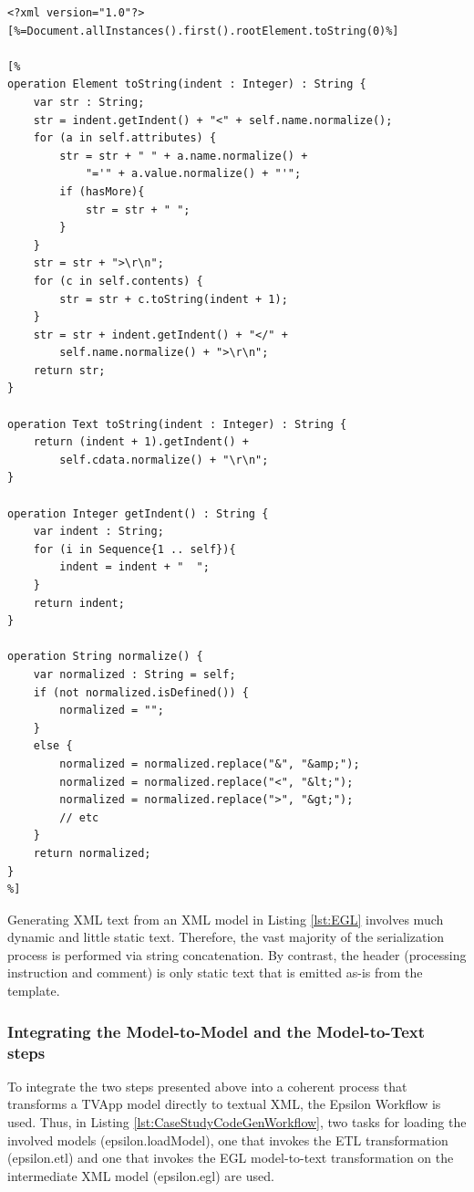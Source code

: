 \begin{lstlisting}[float=tbp, basicstyle=\ttfamily\footnotesize, nolol=true, flexiblecolumns=true, caption=EGL template that generates XML text from XML models, tabsize=2, label=lst:EGL, language=EOL]
<?xml version="1.0"?>
[%=Document.allInstances().first().rootElement.toString(0)%]

[%
operation Element toString(indent : Integer) : String {
	var str : String;
	str = indent.getIndent() + "<" + self.name.normalize();
	for (a in self.attributes) {
		str = str + " " + a.name.normalize() + 
			"='" + a.value.normalize() + "'";
		if (hasMore){
			str = str + " ";
		}
	}
	str = str + ">\r\n";
	for (c in self.contents) {
		str = str + c.toString(indent + 1);
	}
	str = str + indent.getIndent() + "</" + 
		self.name.normalize() + ">\r\n";
	return str;
}

operation Text toString(indent : Integer) : String {
	return (indent + 1).getIndent() + 
		self.cdata.normalize() + "\r\n";
}

operation Integer getIndent() : String {
	var indent : String;
	for (i in Sequence{1 .. self}){
		indent = indent + "  ";
	}
	return indent;
}

operation String normalize() {
	var normalized : String = self;
	if (not normalized.isDefined()) { 
		normalized = "";
	}
	else {
		normalized = normalized.replace("&", "&amp;");
		normalized = normalized.replace("<", "&lt;");
		normalized = normalized.replace(">", "&gt;");
		// etc
	}
	return normalized;
}
%]
\end{lstlisting}

Generating XML text from an XML model in Listing \ref{lst:EGL} involves much dynamic and little static text. Therefore, the vast majority of the serialization process is performed via string concatenation. By contrast, the header (processing instruction and comment) is only static text that is emitted as-is from the template.

\subsubsection{Integrating the Model-to-Model and the Model-to-Text steps}

To integrate the two steps presented above into a coherent process that transforms a TVApp model directly to textual XML, the Epsilon Workflow is used. Thus, in Listing \ref{lst:CaseStudyCodeGenWorkflow}, two tasks for loading the involved models (epsilon.loadModel), one that invokes the ETL transformation (epsilon.etl) and one that invokes the EGL model-to-text transformation on the intermediate XML model (epsilon.egl) are used.

